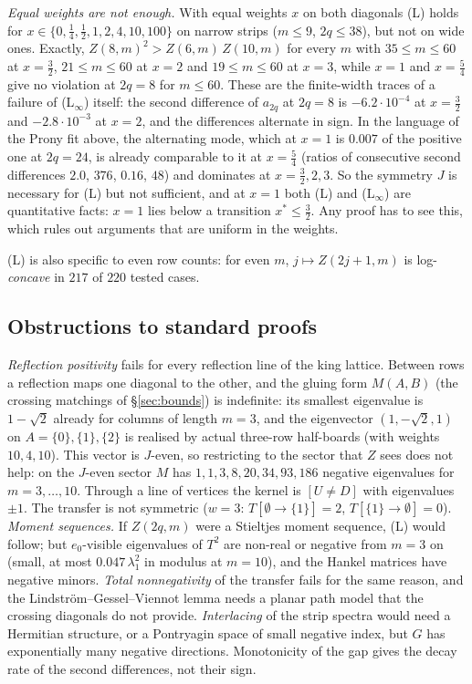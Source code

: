 \documentclass[11pt]{amsart}
\theoremstyle{definition}
\theoremstyle{remark}
\begin{document}
\emph{Equal weights are not enough.} With equal weights $x$ on both diagonals (L) holds for
$x \in \{0, \tfrac14, \tfrac12, 1, 2, 4, 10, 100\}$ on narrow strips ($m \le 9$, $2q \le 38$), but
not on wide ones. Exactly, $Z(8, m)^2 > Z(6, m)\,Z(10, m)$ for every $m$ with $35 \le m \le 60$
at $x = \tfrac32$, $21 \le m \le 60$ at $x = 2$ and $19 \le m \le 60$ at $x = 3$, while $x = 1$
and $x = \tfrac54$ give no violation at $2q = 8$ for $m \le 60$. These are the finite-width traces of a
failure of (L$_\infty$) itself: the second difference of $a_{2q}$ at $2q = 8$ is $-6.2\cdot10^{-4}$
at $x = \tfrac32$ and $-2.8\cdot10^{-3}$ at $x = 2$, and the differences alternate in sign. In the
language of the Prony fit above, the alternating mode, which at $x = 1$ is $0.007$ of the positive
one at $2q = 24$, is already comparable to it at $x = \tfrac54$ (ratios of consecutive second
differences $2.0$, $376$, $0.16$, $48$) and dominates at $x = \tfrac32, 2, 3$. So the symmetry $J$ is
necessary for (L) but not sufficient, and at $x = 1$ both (L) and (L$_\infty$) are quantitative
facts: $x = 1$ lies below a transition $x^* \le \tfrac32$. Any proof has to see this, which rules
out arguments that are uniform in the weights.

(L) is also specific to even row counts: for even $m$, $j \mapsto Z(2j + 1, m)$ is
log-\emph{concave} in $217$ of $220$ tested cases.

\subsection{Obstructions to standard proofs}\label{sec:obstructions}
\emph{Reflection positivity} fails for every reflection line of the king lattice. Between rows a
reflection maps one diagonal to the other, and the gluing form $M(A, B)$ (the crossing matchings of
\S\ref{sec:bounds}) is indefinite: its smallest eigenvalue is $1 - \sqrt2$ already for columns of
length $m = 3$, and the eigenvector $(1, -\sqrt2, 1)$ on $A = \{0\}, \{1\}, \{2\}$ is realised by
actual three-row half-boards (with weights $10, 4, 10$). This vector is $J$-even, so restricting
to the sector that $Z$ sees does not help: on the $J$-even sector $M$ has $1, 1, 3, 8, 20, 34, 93,
186$ negative eigenvalues for $m = 3, \dots, 10$. Through a line of vertices the kernel is
$[U \ne D]$ with eigenvalues $\pm1$. The transfer is not symmetric ($w = 3$:
$T[\emptyset \to \{1\}] = 2$, $T[\{1\} \to \emptyset] = 0$).
\emph{Moment sequences.} If $Z(2q, m)$ were a Stieltjes moment sequence, (L) would follow; but
$e_0$-visible eigenvalues of $T^2$ are non-real or negative from $m = 3$ on (small, at most
$0.047\,\lambda_1^2$ in modulus at $m = 10$), and the Hankel matrices have negative minors.
\emph{Total nonnegativity} of the transfer fails for the same reason, and the
Lindstr\"om--Gessel--Viennot lemma needs a planar path model that the crossing diagonals do not
provide. \emph{Interlacing} of the strip spectra would need a Hermitian structure, or a Pontryagin
space of small negative index, but $G$ has exponentially many negative directions. Monotonicity of
the gap gives the decay rate of the second differences, not their sign.
\end{document}
